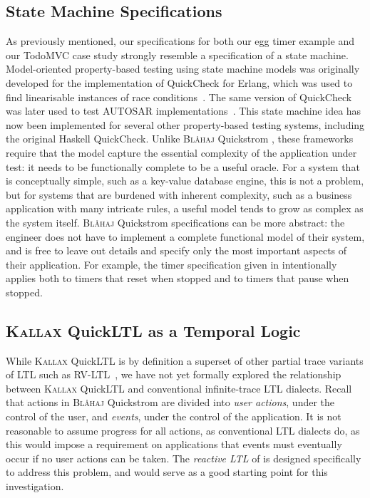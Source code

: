 \documentclass[sigplan,nonacm,10pt]{acmart}
\makeatletter
\newcommand{\Quickstrom}[0]{%
  \if@ACM@anonymous%
  \textsc{Bl\aa{}haj}%
  \else%
  Quickstrom%
  \fi\xspace}
\newcommand{\QuickLTL}[0]{%
    \if@ACM@anonymous%
    \textsc{Kallax}%
    \else%
    QuickLTL%
    \fi\xspace}
\makeatother
\begin{document}
\subsection{State Machine Specifications}
As previously mentioned, our specifications for both our egg timer example and our TodoMVC case study strongly resemble a specification of a state machine. Model-oriented property-based testing using state machine models was originally developed for
the implementation of QuickCheck for Erlang, which was used to find linearisable instances of race conditions~\citep{qcmutex}. The same version of QuickCheck was later used to test AUTOSAR implementations~\citep{autosar,autosar2}. This state machine idea has now been implemented for several other property-based testing systems,
including the original Haskell QuickCheck.
Unlike \Quickstrom, these frameworks require that the model capture the essential complexity of the application under test: it needs to be functionally complete to be a useful oracle. For a system that is conceptually simple,
such as a key-value database engine, this is not a problem, but for systems that are burdened with inherent complexity, such as a business application with many intricate rules, a useful model tends to grow as complex as the system itself.
\Quickstrom specifications can be more abstract: the engineer does not have to implement a complete functional model of their system, and is free to leave out details and specify only the most important aspects of their application.
For example, the timer specification given in  intentionally applies both to timers that reset when stopped and to timers that pause when stopped.

\subsection{\QuickLTL as a Temporal Logic}
While \QuickLTL is by definition a superset of other partial trace variants of LTL such as RV-LTL~\citep{rvltl}, we have not yet formally explored the relationship between \QuickLTL and conventional infinite-trace LTL dialects.
Recall that actions in \Quickstrom are divided into \emph{user actions}, under the control of the user, and \emph{events}, under the control of the application.
It is not reasonable to assume progress for all actions, as conventional LTL dialects do, as this would impose a requirement on applications that events must eventually occur if no user actions can be taken. The \emph{reactive LTL} of \citet{rvg_ltl} is designed specifically to address this
problem, and would serve as a good starting point for this investigation.
\end{document}
